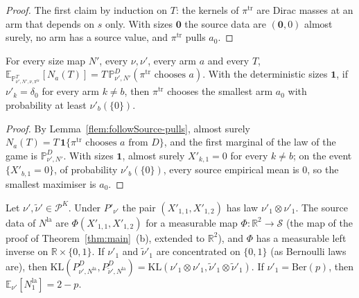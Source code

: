 \documentclass[11pt]{article}
\newcommand{\E}{\mathbb{E}}
\begin{document}
\begin{proof}
The first claim by induction on $T$: the kernels of $\pi^{\mathrm{tr}}$ are Dirac masses at an arm
that depends on $s$ only. With sizes $\mathbf 0$ the source data are $(\mathbf 0,0)$ almost surely,
no arm has a source value, and $\pi^{\mathrm{tr}}$ pulls $a_0$.
\end{proof}

\begin{lemma}\label{flem:followSource-one}
For every size map $N'$, every $\nu,\nu'$, every arm $a$ and every $T$,
$\E_{\mathbb P^T_{\nu',N',\nu,\pi^{\mathrm{tr}}}}[N_a(T)]=T\,\mathbb P^D_{\nu',N'}(\pi^{\mathrm{tr}}
\text{ chooses } a)$. With the deterministic sizes $\mathbf 1$, if $\nu'_k=\delta_0$ for every arm
$k\ne b$, then $\pi^{\mathrm{tr}}$ chooses the smallest arm $a_0$ with probability at least
$\nu'_b(\{0\})$.
\end{lemma}

\begin{proof}
By Lemma~\ref{flem:followSource-pulls}, almost surely $N_a(T)=T\,\mathbf 1\{\pi^{\mathrm{tr}}
\text{ chooses } a \text{ from } D\}$, and the first marginal of the law of the game is
$\mathbb P^D_{\nu',N'}$. With sizes $\mathbf 1$, almost surely $X'_{k,1}=0$ for every $k\ne b$;
on the event $\{X'_{b,1}=0\}$, of probability $\nu'_b(\{0\})$, every source empirical mean is
$0$, so the smallest maximiser is $a_0$.
\end{proof}

\begin{lemma}\label{flem:lookahead-data}
Let $\nu',\tilde\nu'\in\mathcal P^K$. Under $P'_{\nu'}$ the pair $(X'_{1,1},X'_{1,2})$ has law
$\nu'_1\otimes\nu'_1$. The source data of $N^{\mathrm{la}}$ are $\Phi(X'_{1,1},X'_{1,2})$ for a
measurable map $\Phi\colon\mathbb R^2\to\mathcal S$ (the map of the proof of
Theorem~\ref{thm:main}~(b), extended to $\mathbb R^2$), and $\Phi$ has a measurable left inverse on
$\mathbb R\times\{0,1\}$. If $\nu'_1$ and $\tilde\nu'_1$ are concentrated on $\{0,1\}$ (as Bernoulli
laws are), then
$\mathrm{KL}(P^D_{\nu',N^{\mathrm{la}}},P^D_{\tilde\nu',N^{\mathrm{la}}})
=\mathrm{KL}(\nu'_1\otimes\nu'_1,\tilde\nu'_1\otimes\tilde\nu'_1)$. If $\nu'_1=\mathrm{Ber}(p)$, then
$\E_{\nu'}[N^{\mathrm{la}}_1]=2-p$.
\end{lemma}
\end{document}
